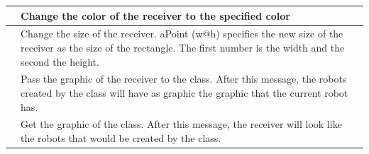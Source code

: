 \begin{table}[h]
\begin{tabular}{||p{4cm}|p{7cm}|p{5cm}||}
\ct{color: aColor}&Change the color of the receiver to the specified color& \ct{\Turtle new color: Color yellow}\\ \hline
\ct{extent: aPoint}&Change the size of the receiver. aPoint (w@h) specifies the new size of the receiver as the size of the rectangle. The first number is the width and the second the height. &\ct{\Turtle new extent: 80@100}\\ \hline

\ct{passImageToClass}&Pass the graphic of the receiver to the class. After this message, the robots created by the class will have as graphic the graphic that the current robot has.&\ct{aBot passImageToClass}\\ \hline

\ct{getImageFromClass}&Get the graphic of the class. After this message, the receiver will look like the robots that would be created by the class.&\ct{aBot getImageFromClass}\\ \hline


\end{tabular}
\end{table}

\ifx\wholebook\relax\else\fi